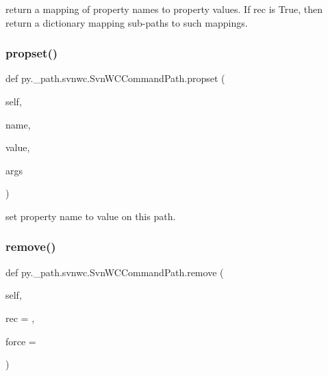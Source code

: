 \begin{DoxyVerb}return a mapping of property names to property values.
If rec is True, then return a dictionary mapping sub-paths to such mappings.
\end{DoxyVerb}
 \mbox{\label{classpy_1_1__path_1_1svnwc_1_1_svn_w_c_command_path_a31a352044c5007ca2ad5414774498296}} 
\subsubsection{\texorpdfstring{propset()}{propset()}}
{\footnotesize\ttfamily def py.\+\_\+path.\+svnwc.\+Svn\+W\+C\+Command\+Path.\+propset (\begin{DoxyParamCaption}\item[{}]{self,  }\item[{}]{name,  }\item[{}]{value,  }\item[{}]{args }\end{DoxyParamCaption})}

\begin{DoxyVerb}set property name to value on this path. \end{DoxyVerb}
 \mbox{\label{classpy_1_1__path_1_1svnwc_1_1_svn_w_c_command_path_a6284a7e36081f029a2ddd256abcf0b82}} 
\subsubsection{\texorpdfstring{remove()}{remove()}}
{\footnotesize\ttfamily def py.\+\_\+path.\+svnwc.\+Svn\+W\+C\+Command\+Path.\+remove (\begin{DoxyParamCaption}\item[{}]{self,  }\item[{}]{rec = {},  }\item[{}]{force = {} }\end{DoxyParamCaption})}

